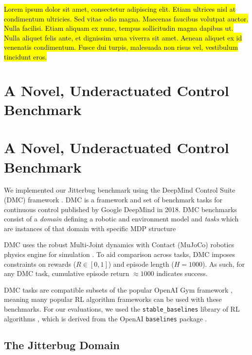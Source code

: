 \documentclass[letterpaper, 10 pt, conference]{ieeeconf}
\begin{document}
\hl{Lorem ipsum dolor sit amet, consectetur adipiscing elit. Etiam ultrices nisl at condimentum ultricies. Sed vitae odio magna. Maecenas faucibus volutpat auctor. Nulla facilisi. Etiam aliquam ex nunc, tempus sollicitudin magna dapibus ut. Nulla aliquet felis ante, et dignissim urna viverra sit amet. Aenean aliquet ex id venenatis condimentum. Fusce dui turpis, malesuada non risus vel, vestibulum tincidunt eros.}

\section{A Novel, Underactuated Control Benchmark}

\section{A Novel, Underactuated Control Benchmark}
We implemented our Jitterbug benchmark using the DeepMind Control Suite (DMC) framework \cite{Tassa2018DMC}.
DMC is a framework and set of benchmark tasks for continuous control published by Google DeepMind in 2018.
DMC benchmarks consist of a \emph{domain} defining a robotic and environment model and \emph{tasks} which are instances of that domain with specific MDP structure

DMC uses the robust Multi-Joint dynamics with Contact (MuJoCo) robotics physics engine for simulation \cite{Todorov2012MuJoCo}.
To aid comparison across tasks, DMC imposes constraints on rewards ($R \in [0, 1]$) and episode length ($H = 1000$).
As such, for any DMC task, cumulative episode return $\approx 1000$ indicates success.

DMC tasks are compatible subsets of the popular OpenAI Gym framework \cite{Brockman2016Gym}, meaning many popular RL algorithm frameworks can be used with these benchmarks.
For our evaluations, we used the \texttt{stable\_baselines} library of RL algorithms \cite{Hill2018Stable}, which is derived from the OpenAI \texttt{baselines} package \cite{Dhariwal2017Baselines}.

\subsection{The Jitterbug Domain}
\end{document}
